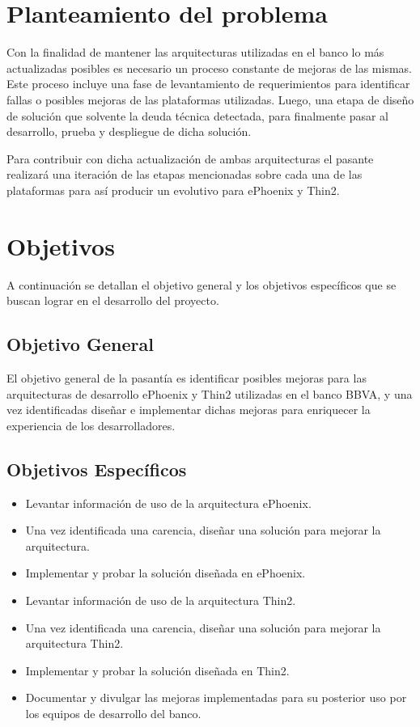 \section*{Planteamiento del problema}

Con la finalidad de mantener las arquitecturas utilizadas en el banco lo
más actualizadas posibles es necesario un proceso constante de mejoras de
las mismas. Este proceso incluye una fase de levantamiento de requerimientos
para identificar fallas o posibles mejoras de las plataformas utilizadas. Luego,
una etapa de diseño de solución que solvente la deuda técnica detectada, para
finalmente pasar al desarrollo, prueba y despliegue de dicha solución.

Para contribuir con dicha actualización de ambas arquitecturas el pasante realizará
una iteración de las etapas mencionadas sobre cada una de las plataformas para
así producir un evolutivo para ePhoenix y Thin2.

\section*{Objetivos}
A continuación se detallan el objetivo general y los objetivos específicos que
se buscan lograr en el desarrollo del proyecto.
\subsection*{Objetivo General}
El objetivo general de la pasantía es identificar posibles mejoras para las arquitecturas
de desarrollo ePhoenix y Thin2 utilizadas en el banco BBVA, y una vez
identificadas diseñar e implementar dichas mejoras para enriquecer la experiencia
de los desarrolladores.
\subsection*{Objetivos Específicos}
\begin{itemize}
  \item Levantar información de uso de la arquitectura ePhoenix.
  \item Una vez identificada una carencia, diseñar una solución para
        mejorar la arquitectura.
  \item Implementar y probar la solución diseñada en ePhoenix.
  \item Levantar información de uso de la arquitectura Thin2.
  \item Una vez identificada una carencia, diseñar una solución para
        mejorar la arquitectura Thin2.
  \item Implementar y probar la solución diseñada en Thin2.
  \item Documentar y divulgar las mejoras implementadas para su
        posterior uso por los equipos de desarrollo del banco.
\end{itemize}

